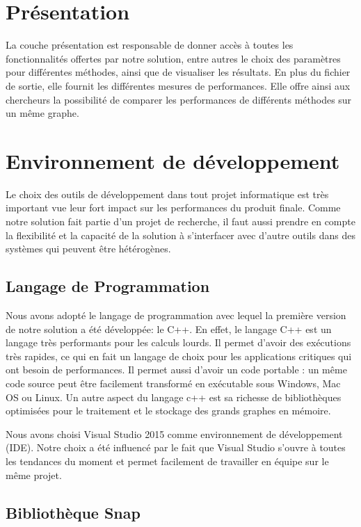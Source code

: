 	
	\section{Présentation}
	
	La couche présentation est responsable de donner accès à toutes les fonctionnalités offertes par notre solution, entre autres le choix des paramètres pour différentes méthodes, ainsi que de visualiser les résultats. En plus du fichier de sortie, elle fournit les différentes mesures de performances. Elle offre ainsi aux chercheurs la possibilité de comparer les performances de différents méthodes sur un même graphe. 
	
	\section{Environnement de développement}
		
		Le choix des outils de développement dans tout projet informatique est très important vue leur fort impact sur les performances du produit finale. Comme notre solution fait partie d'un projet de recherche, il faut aussi prendre en compte la flexibilité et la capacité de la solution à s'interfacer avec d'autre outils dans des systèmes qui peuvent être hétérogènes. 
		
		\subsection{Langage de Programmation}
		Nous avons adopté le langage de programmation avec lequel la    première version de notre solution a été développée: le C++. En effet, le langage C++ est un langage très performants pour les calculs lourds. Il permet d'avoir des exécutions très rapides, ce qui en fait un langage de choix pour les applications critiques qui ont besoin de performances. Il permet aussi d'avoir un code portable : un même code source peut être facilement transformé en exécutable sous Windows, Mac OS ou Linux. Un autre aspect du langage c++ est sa richesse de bibliothèques optimisées pour le traitement et le stockage des grands graphes en mémoire. 
		
		Nous avons choisi Visual Studio 2015 comme environnement de développement (IDE). Notre choix a été influencé par le fait que Visual Studio s'ouvre à toutes les tendances du moment et permet facilement de travailler en équipe sur le même projet.
		
		\subsection{Bibliothèque Snap}
		\label{snaplib}
			
